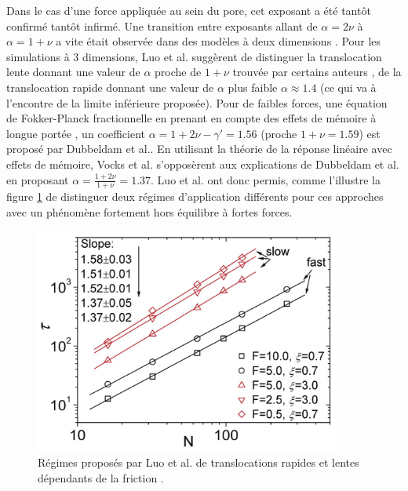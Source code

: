  Dans le cas d'une force appliquée au sein du pore, cet exposant a été tantôt confirmé tantôt infirmé. Une transition entre exposants allant de $\alpha=2\nu$ à $\alpha=1+\nu$ a vite était observée dans des modèles à deux dimensions \cite{Huopaniemi2006,2Luo2006,Luo2007}. Pour les simulations à 3 dimensions, Luo et al. \cite{Luo2009} suggèrent de distinguer la translocation lente donnant une valeur de $\alpha$ proche de $1+\nu$ trouvée par certains auteurs \cite{Kantor2004,Gauthier2008}, de la translocation rapide donnant une valeur de $\alpha$ plus faible $\alpha \approx 1.4$ \cite{Bhattacharya2009,Luo2008,Sakaue2007} (ce qui va à l'encontre de la limite inférieure proposée). Pour de faibles forces, une équation de Fokker-Planck fractionnelle en prenant en compte des effets de mémoire à longue portée \cite{Metzler2000}, un coefficient $\alpha = 1+ 2\nu - \gamma' = 1.56$ (proche $1+ \nu=1.59$) est proposé par Dubbeldam et al.\cite{Dubbeldam2007}. En utilisant la théorie de la réponse linéaire avec effets de mémoire, Vocks et al.\cite{Vocks2008} s'opposèrent aux explications de Dubbeldam et al. en proposant $\alpha= \frac{1+2\nu}{1+\nu} =1.37$. Luo et al.\cite{Luo2009} ont donc permis, comme l'illustre la figure \ref{slowandfast} de distinguer deux régimes d'application différents pour ces approches avec un phénomène fortement hors équilibre à fortes forces.
 
 
\begin{figure}[H]
\begin{center}
\includegraphics[width=0.9\textwidth]{slowandfasttransloc.jpg}


\caption[Translocations rapides et lentes]{Régimes proposés par Luo et al. de translocations rapides et lentes dépendants de la friction \cite{Luo2009}.}
\label{slowandfast}
\end{center}
\end{figure}

